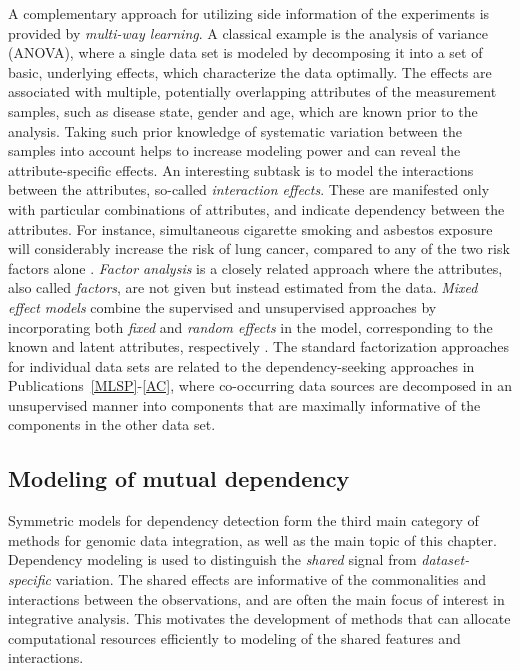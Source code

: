A complementary approach for utilizing side information of the
experiments is provided by {\it multi-way learning}. A classical
example is the analysis of variance (ANOVA), where a single data set
is modeled by decomposing it into a set of basic, underlying effects,
which characterize the data optimally. The effects are associated with
multiple, potentially overlapping attributes of the measurement
samples, such as disease state, gender and age, which are known prior
to the analysis. Taking such prior knowledge of systematic variation
between the samples into account helps to increase modeling power and
can reveal the attribute-specific effects. An interesting subtask is
to model the interactions between the attributes, so-called {\it
interaction effects}. These are manifested only with particular
combinations of attributes, and indicate dependency between the
attributes. For instance, simultaneous cigarette smoking and asbestos
exposure will considerably increase the risk of lung cancer, compared
to any of the two risk factors alone \citep[see
e.g.][]{Nymark07}. {\it Factor analysis} is a closely related approach
where the attributes, also called {\it factors}, are not given but
instead estimated from the data. {\it Mixed effect models} combine the
supervised and unsupervised approaches by incorporating both {\it
fixed} and {\it random effects} in the model, corresponding to the
known and latent attributes, respectively \citep[see
e.g.][]{Carvalho08}. The standard factorization approaches for
individual data sets are related to the dependency-seeking approaches
in Publications~\ref{MLSP}-\ref{AC}, where co-occurring data sources
are decomposed in an unsupervised manner into components that are
maximally informative of the components in the other data set. 

\subsection{Modeling of mutual dependency}

Symmetric models for dependency detection form the third main category
of methods for genomic data integration, as well as the main topic of
this chapter. Dependency modeling is used to distinguish the {\it
shared} signal from {\it dataset-specific} variation. The shared
effects are informative of the commonalities and interactions between
the observations, and are often the main focus of interest in
integrative analysis. This motivates the development of methods that
can allocate computational resources efficiently to modeling of the
shared features and interactions.

